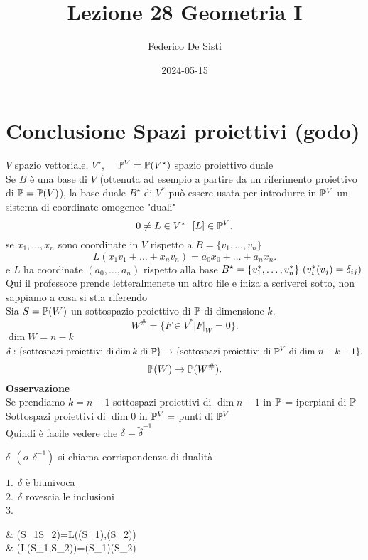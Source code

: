\documentclass[12px]{article}
\title{Lezione 28 Geometria I}
\date{2024-05-15}
\author{Federico De Sisti}
\begin{document}
	\maketitle
	\newpage
	\section{Conclusione Spazi proiettivi (godo)}
	$V$ spazio vettoriale, $V^\star$, \ \ $\mathbb{P}^V=\mathbb{P}(V^\star)$ spazio proiettivo duale \\
	Se $B$ è una base di $V$ (ottenuta ad esempio a partire da un riferimento proiettivo di $\mathbb{P} = \mathbb{P}(V)$), la base duale  $B^\star$ di $V^*$ può essere usata per introdurre in $\mathbb{P}^V$ un sistema di coordinate omogenee "duali"
	\[
		0\neq L\in V^\star \ \ [L]\in\mathbb{P}^V 
	.\] 
	se $x_1,\ldots,x_n$ sono coordinate in $V$ rispetto a $B=\{v_1,\ldots,v_n\}$ 
	\[
	L(x_1v_1+\ldots+x_nv_n) = a_0x_0+\ldots+a_nx_n
	.\] 
	e $L$ ha coordinate $(a_0,\ldots,a_n)$ rispetto alla base $B^\star=\{v_1^*,\ldots,v_n^*\}\ \ \\ (v_i^*(v_j)=\delta_{ij})$\\
	Qui il professore prende letteralmenete un altro file e iniza a scriverci sotto, non sappiamo a cosa si stia riferendo\\
	Sia $S=\mathbb{P}(W)$ un sottospazio proiettivo di  $\mathbb{P}$ di dimensione $k$.
	\[
		W^\# =\{F\in V^*|F|_W=0\}
	.\] 
	$\dim W = n - k$
	\[
		\delta:\{\text{sottospazi proiettivi di} \dim k \text{ di } \mathbb{P}\} \rightarrow \{\text{sottospazi proiettivi di }\mathbb{P}^V \text{ di dim } n-k-1\}
	.\] 
		\[
		\mathbb{P}(W) \rightarrow \mathbb{P}(W^\#)
		.\] 
	\textbf{Osservazione}\\
	Se prendiamo $k = n-1$ sottospazi proiettivi di $\dim n - 1$ in $\mathbb{P}$ = iperpiani di $\mathbb{P}$\\
	Sottospazi proiettivi di  $\dim 0$ in $\mathbb{P}^V = $ punti di $\mathbb{P}^V$\\
	Quindi è facile vedere che  $\delta = \widetilde{\delta}^{-1}$ \\
	\begin{nome}
		$\delta \ \ (o \ \ \delta^{-1})$ si chiama corrispondenza di dualità
\end{nome}
\begin{lemm}
	$1. \ \ \delta $ è biunivoca\\
	$2. \ \ \delta$ rovescia le inclusioni\\
	$3.$ \ \ \begin{aligend}
		& \delta(S_1\cap S_2)=L(\delta(S_1),\delta(S_2))\\
		& \delta(L(S_1,S_2))=\delta(S_1)\cap\delta (S_2)\\
	\end{aligend}
\end{lemm}
\end{document}
